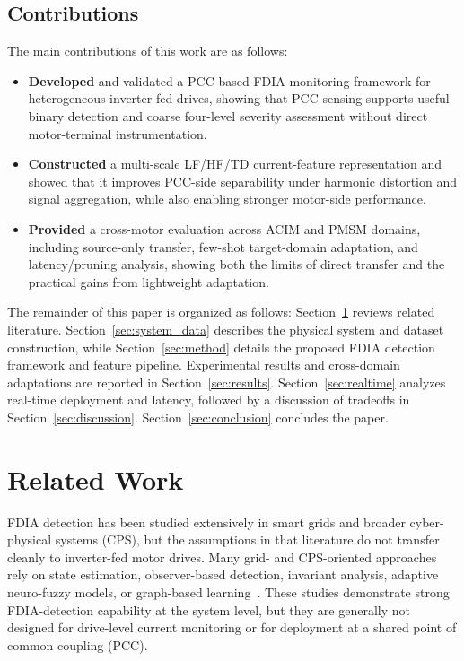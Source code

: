 \documentclass[lettersize,journal]{IEEEtran}
\newcommand{\COMMENTYe}[1]{{\bf\color{red} Ye: #1}}
\begin{document}
\subsection{Contributions}
\label{sec:contributions}
The main contributions of this work are as follows:

\begin{itemize}
    \item \textbf{Developed} and validated a PCC-based FDIA monitoring framework for heterogeneous inverter-fed drives, showing that PCC sensing supports useful binary detection and coarse four-level severity assessment without direct motor-terminal instrumentation.
    \item \textbf{Constructed} a multi-scale LF/HF/TD current-feature representation and showed that it improves PCC-side separability under harmonic distortion and signal aggregation, while also enabling stronger motor-side performance.
    \item \textbf{Provided} a cross-motor evaluation across ACIM and PMSM domains, including source-only transfer, few-shot target-domain adaptation, and latency/pruning analysis, showing both the limits of direct transfer and the practical gains from lightweight adaptation.
\end{itemize}

The remainder of this paper is organized as follows: Section~\ref{sec:relatedWorks} reviews related literature. Section~\ref{sec:system_data} describes the physical system and dataset construction, while Section~\ref{sec:method} details the proposed FDIA detection framework and feature pipeline. Experimental results and cross-domain adaptations are reported in Section~\ref{sec:results}. Section~\ref{sec:realtime} analyzes real-time deployment and latency, followed by a discussion of tradeoffs in Section~\ref{sec:discussion}. Section~\ref{sec:conclusion} concludes the paper.

\section{Related Work}
\label{sec:relatedWorks}

FDIA detection has been studied extensively in smart grids and broader cyber-physical systems (CPS), but the assumptions in that literature do not transfer cleanly to inverter-fed motor drives. Many grid- and CPS-oriented approaches rely on state estimation, observer-based detection, invariant analysis, adaptive neuro-fuzzy models, or graph-based learning~\cite{7438916,basati2022fdi,nath2022quickest,beg2017fdia,sargolzaei2020fdia,10016905}. These studies demonstrate strong FDIA-detection capability at the system level, but they are generally not designed for drive-level current monitoring or for deployment at a shared point of common coupling (PCC).
\end{document}
